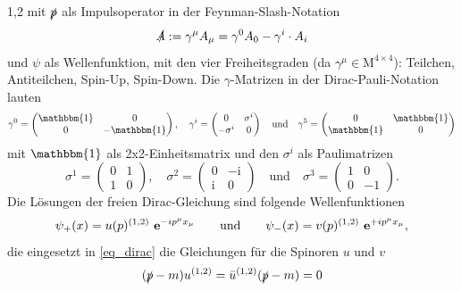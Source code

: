 \documentclass[11pt,a4paper,twoside,draft]{report}
\begin{document}
\begin{spacing}{1,2}
mit $\slashed{p}$ als Impulsoperator in der Feynman-Slash-Notation
\begin{equation}
 \slashed{A} := \gamma^\mu A_\mu = \gamma^0 A_0 - \gamma^i\cdot A_i
\end{equation}
und $\psi$ als Wellenfunktion, mit den vier Freiheitsgraden (da $\gamma^\mu \in \text{M}^{4\times4}$): Teilchen, Antiteilchen, Spin-Up, Spin-Down.
Die $\gamma$-Matrizen in der Dirac-Pauli-Notation lauten
\begin{equation*}
  \gamma^0 = \begin{pmatrix} 
              \mathbbm{1} & 0 \\
              0 & -\mathbbm{1}
             \end{pmatrix},\quad \gamma^i = \begin{pmatrix}
					0 & \sigma^i\\
					-\sigma^i & 0
				      \end{pmatrix} \quad \text{und}\quad \gamma^5 = \begin{pmatrix}
									  0 & \mathbbm{1}\\
									  \mathbbm{1} & 0
									   \end{pmatrix}
\end{equation*}
mit $\mathbbm{1}$ als 2x2-Einheitsmatrix und den $\sigma^i$ als Paulimatrizen
\begin{equation*}
 \sigma^1 = \begin{pmatrix}
             0 & 1\\
             1 & 0
            \end{pmatrix},\quad \sigma^2 = \begin{pmatrix}
					    0 & -\text{i}\\
					    \text{i} & 0
					    \end{pmatrix}\quad \text{und} \quad\sigma^3 = \begin{pmatrix}
									    1 & 0\\
									    0 & -1
									    \end{pmatrix}.									    
\end{equation*}
Die Lösungen der freien Dirac-Gleichung sind folgende Wellenfunktionen
\begin{align}
 \psi_+(x) = u(p)^{(1,2)} \ \mathbf{e}^{-ip^\mu x_\mu}\qquad\text{und}\qquad \psi_-(x) = v(p)^{(1,2)} \ \mathbf{e}^{+ip^\mu x_\mu},
 \label{eq_diracLsg}
\end{align}
die eingesetzt in \eqref{eq_dirac} die Gleichungen für die Spinoren $u$ und $v$
\begin{align}
 (\slashed{p} - m )u^{(1,2)} &= \bar u^{(1,2)}(\slashed{p}-m) = 0 \\

\end{align}
\end{spacing}
\end{document}
